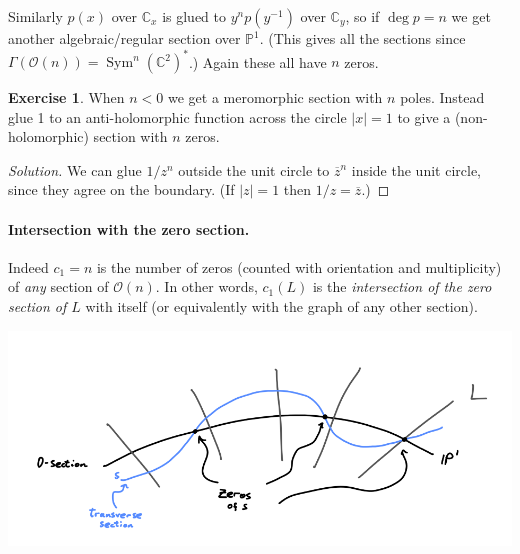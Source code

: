 \documentclass{article}
\theoremstyle{definition}
\newtheorem*{exercise}{Exercise}
\DeclareMathOperator{\Sym}{Sym}
\newcommand{\conj}[1]{\overline{#1}}
\renewcommand{\O}{\mathcal{O}}
\renewcommand{\P}{\mathbb{P}}
\newcommand{\C}{\mathbb{C}}
\begin{document}
Similarly $p(x)$ over $\C_x$ is glued to $y^np(y^{-1})$ over $\C_y$, so if
$\deg p=n$ we get another algebraic/regular section over $\P^1$. (This gives all
the sections since $\Gamma(\O(n))=\Sym^n(\C^2)^*$.) Again these all have $n$
zeros.

\begin{exercise}
    When $n<0$ we get a meromorphic section with $n$ poles. Instead glue 1 to an
    anti-holomorphic function across the circle $|x|=1$ to give a
    (non-holomorphic) section with $n$ zeros.
\end{exercise}

\begin{proof}[Solution]
    We can glue $1/z^n$ outside the unit circle to $\conj z^n$ inside the unit
    circle, since they agree on the boundary. (If $|z|=1$ then $1/z=\conj z$.)
\end{proof}

\paragraph{Intersection with the zero section.}
Indeed $c_1=n$ is the number of zeros (counted with orientation and
multiplicity) of \emph{any} section of $\O(n)$. In other words, $c_1(L)$ is
the \emph{intersection of the zero section of $L$} with itself (or equivalently
with the graph of any other section).
\begin{center}
    \includegraphics[scale=0.6]{chern_section}
\end{center}
\end{document}
